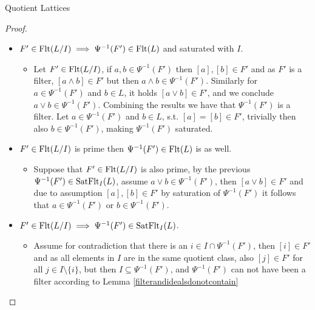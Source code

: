 \begin{subsection}{Quotient Lattices}
\begin{proof}
\begin{itemize}
\begin{itemize}
                        is possible and applying primeness again gives \( a \in F \) or \( b \in F \), but then one of their equivalence classes is in \( \Psi(F) \).
                \end{itemize}
            \item \( F' \in \textnormal{Flt}({L / I}) \implies \Psi^{-1}(F') \in \textnormal{Flt}({L}) \) and saturated with \( I \).
                \begin{itemize}
                    \item 
                        Let \( F' \in \textnormal{Flt}({L / I}) \), if \( a, b \in \Psi^{-1}(F') \) then \( [a], [b] \in F' \)
                        and as \( F' \) is a filter, \( [a \wedge b] \in F' \) but then \( a \wedge b \in \Psi^{-1}(F') \).
                        Similarly for \( a \in \Psi^{-1}(F') \) and \( b \in L \), it holds \( [a \vee b] \in F' \),
                        and we conclude \( a \vee b \in \Psi^{-1}(F') \). Combining the results we have that \( \Psi^{-1}(F') \) is a filter.
                        Let \( a \in \Psi^{-1}(F') \) and \( b \in L \), s.t. 
                        \( [a] = [b] \in F' \), trivially then also \( b \in \Psi^{-1}(F') \), making \( \Psi^{-1}(F') \) saturated.
                \end{itemize}
            \item \( F' \in \textnormal{Flt}({L / I}) \) is prime then \( \Psi^{-1}(F') \in \textnormal{Flt}({L}) \) is as well.
                \begin{itemize}
                    \item 
                        Suppose that \( F' \in \textnormal{Flt}({L / I}) \) is also prime, by the previous \( \Psi^{-1}(F') \in \textnormal{SatFlt}_{I}({L})\),
                        assume \( a \vee b \in \Psi^{-1}(F')\), then \( [a \vee b] \in F' \) and due to assumption \( [a], [b] \in F' \)
                        by saturation of \( \Psi^{-1}(F') \) it follows that \( a \in \Psi^{-1}(F') \) or \( b \in \Psi^{-1}(F') \).
                \end{itemize}
            \item \( F' \in \textnormal{Flt}({L / I}) \implies \Psi^{-1}(F') \in \textnormal{SatFlt}_{I}({L}) \).
                \begin{itemize}
                    \item 
                        Assume for contradiction that there is an \( i \in I \cap \Psi^{-1}(F') \), then \( [i] \in F' \) and as
                        all elements in \( I \) are in the same quotient class, also \( [j] \in F' \) for all \( j \in I \setminus \{i\}\),
                        but then \( I \subseteq \Psi^{-1}(F') \), and \( \Psi^{-1}(F') \) can not have been a filter according to Lemma \ref{filterandidealsdonotcontain}

\end{itemize}
\end{itemize}
\end{proof}
\end{subsection}
